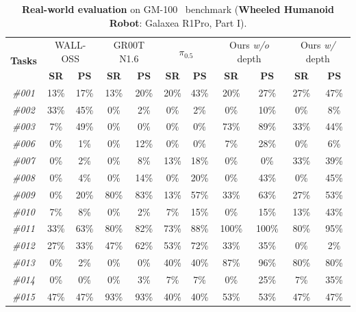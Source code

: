 \begin{table}[t]
  \centering
  \caption{\textbf{Real-world evaluation} on GM-100~\cite{gm100} benchmark (\textbf{Wheeled Humanoid Robot}: Galaxea R1Pro, Part I).}
  \small
  \setlength{\tabcolsep}{12pt}
    \begin{tabular}{ccccccccccc}
    \toprule
    \multirow{2}[2]{*}{\textbf{Tasks}} & \multicolumn{2}{c}{WALL-OSS} & \multicolumn{2}{c}{GR00T N1.6} & \multicolumn{2}{c}{$\pi_{0.5}$} & \multicolumn{2}{c}{Ours \textit{w/o} depth} & \multicolumn{2}{c}{Ours \textit{w/} depth} \\
          & \textbf{SR} & \textbf{PS} & \textbf{SR} & \textbf{PS} & \textbf{SR} & \textbf{PS} & \textbf{SR} & \textbf{PS} & \textbf{SR} & \textbf{PS} \\
    \midrule
    \textit{\#001} & 13\%  & 17\%  & 13\%  & 20\%  & 20\%  & 43\%  & 20\%  & 27\%  & 27\%  & 47\% \\
    \textit{\#002} & 33\%  & 45\%  & 0\%   & 2\%   & 0\%   & 2\%   & 0\%   & 10\%  & 0\%   & 8\% \\
    \textit{\#003} & 7\%   & 49\%  & 0\%   & 0\%   & 0\%   & 0\%   & 73\%  & 89\%  & 33\%  & 44\% \\
    \textit{\#006} & 0\%   & 1\%   & 0\%   & 12\%  & 0\%   & 0\%   & 7\%   & 28\%  & 0\%   & 6\% \\
    \textit{\#007} & 0\%   & 2\%   & 0\%   & 8\%   & 13\%  & 18\%  & 0\%   & 0\%   & 33\%  & 39\% \\
    \textit{\#008} & 0\%   & 4\%   & 0\%   & 14\%  & 0\%   & 20\%  & 0\%   & 43\%  & 0\%   & 45\% \\
    \textit{\#009} & 0\%   & 20\%  & 80\%  & 83\%  & 13\%  & 57\%  & 33\%  & 63\%  & 27\%  & 53\% \\
    \textit{\#010} & 7\%   & 8\%   & 0\%   & 2\%   & 7\%   & 15\%  & 0\%   & 15\%  & 13\%  & 43\% \\
    \textit{\#011} & 33\%  & 63\%  & 80\%  & 82\%  & 73\%  & 88\%  & 100\% & 100\% & 80\%  & 95\% \\
    \textit{\#012} & 27\%  & 33\%  & 47\%  & 62\%  & 53\%  & 72\%  & 33\%  & 35\%  & 0\%   & 2\% \\
    \textit{\#013} & 0\%   & 2\%   & 0\%   & 0\%   & 40\%  & 40\%  & 87\%  & 96\%  & 80\%  & 80\% \\
    \textit{\#014} & 0\%   & 0\%   & 0\%   & 3\%   & 7\%   & 7\%   & 0\%   & 25\%  & 7\%   & 35\% \\
    \textit{\#015} & 47\%  & 47\%  & 93\%  & 93\%  & 40\%  & 40\%  & 53\%  & 53\%  & 47\%  & 47\% \\

\end{tabular}
\end{table}
